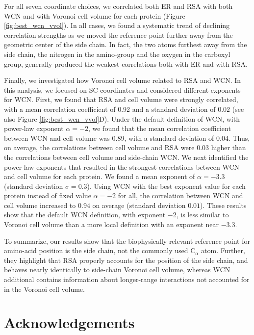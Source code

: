 \documentclass[12pt]{article}
\begin{document}
    For all seven coordinate choices, we correlated both ER and RSA with both WCN and with Voronoi cell volume for each protein (Figure \ref{fig:best_wcn_vvol}). In all cases, we found a systematic trend of declining correlation strengths as we moved the reference point further away from the geometric center of the side chain. In fact, the two atoms furthest away from the side chain, the nitrogen in the amino-group and the oxygen in the carboxyl group, generally produced the weakest correlations both with ER and with RSA.
    
Finally, we investigated how Voronoi cell volume related to RSA and WCN. In this analysis, we focused on SC coordinates and considered different exponents for WCN. First, we found that RSA and cell volume were strongly correlated, with a mean correlation coefficient of 0.92 and a standard deviation of $0.02$ (see also Figure \ref{fig:best_wcn_vvol}D). Under the default definition of WCN, with power-law exponent $\alpha=-2$, we found that the mean correlation coefficient between WCN and cell volume was 0.89, with a standard deviation of 0.04. Thus, on average, the correlations between cell volume and RSA were 0.03 higher than the correlations between cell volume and side-chain WCN. We next identified the power-law exponents that resulted in the strongest correlations between WCN and cell volume for each protein. We found a mean exponent of $\alpha=-3.3$ (standard deviation $\sigma=0.3$). Using WCN with the best exponent value for each protein instead of fixed value $\alpha=-2$ for all, the correlation between WCN and cell volume increased to $0.94$ on average (standard deviation $0.01$). These results show that the default WCN definition, with exponent $-2$, is less similar to Voronoi cell volume than a more local definition with an exponent near $-3.3$.
    
To summarize, our results show that the biophysically relevant reference point for amino-acid position is the side chain, not the commonly used C$_\alpha$ atom. Further, they highlight that RSA properly accounts for the position of the side chain, and behaves nearly identically to side-chain Voronoi cell volume, whereas WCN additional contains information about longer-range interactions not accounted for in the Voronoi cell volume.
    

\section*{Acknowledgements}
\end{document}
